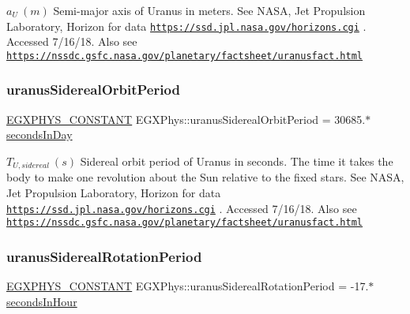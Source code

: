 $ a_{U} \ (m)$ Semi-\/major axis of Uranus in meters. See N\+A\+SA, Jet Propulsion Laboratory, Horizon for data \href{https://ssd.jpl.nasa.gov/horizons.cgi}{\tt https\+://ssd.\+jpl.\+nasa.\+gov/horizons.\+cgi} . Accessed 7/16/18. Also see \href{https://nssdc.gsfc.nasa.gov/planetary/factsheet/uranusfact.html}{\tt https\+://nssdc.\+gsfc.\+nasa.\+gov/planetary/factsheet/uranusfact.\+html} \mbox{\label{group___e_g_x_phys-_constants-_astrophysics-_solar_system-_uranus-_orbit_gaf2077b1c1b606d34f14b5d23ca2c160a}} 
\subsubsection{\texorpdfstring{uranus\+Sidereal\+Orbit\+Period}{uranusSiderealOrbitPeriod}}
{\footnotesize\ttfamily \mbox{\hyperlink{group___e_g_x_phys-_constants-_macros_ga76980d288494ce1714c9ac68a95ba702}{E\+G\+X\+P\+H\+Y\+S\+\_\+\+C\+O\+N\+S\+T\+A\+NT}} E\+G\+X\+Phys\+::uranus\+Sidereal\+Orbit\+Period = 30685.$\ast$\mbox{\hyperlink{namespace_e_g_x_phys_a93d2a00d75411b58cbf63ab3fd1f8bc2}{seconds\+In\+Day}}}

$ T_{U,sidereal} \ (s)$ Sidereal orbit period of Uranus in seconds. The time it takes the body to make one revolution about the Sun relative to the fixed stars. See N\+A\+SA, Jet Propulsion Laboratory, Horizon for data \href{https://ssd.jpl.nasa.gov/horizons.cgi}{\tt https\+://ssd.\+jpl.\+nasa.\+gov/horizons.\+cgi} . Accessed 7/16/18. Also see \href{https://nssdc.gsfc.nasa.gov/planetary/factsheet/uranusfact.html}{\tt https\+://nssdc.\+gsfc.\+nasa.\+gov/planetary/factsheet/uranusfact.\+html} \mbox{\label{group___e_g_x_phys-_constants-_astrophysics-_solar_system-_uranus-_orbit_ga69a761e11c43df2e68ad5865561bd40a}} 
\subsubsection{\texorpdfstring{uranus\+Sidereal\+Rotation\+Period}{uranusSiderealRotationPeriod}}
{\footnotesize\ttfamily \mbox{\hyperlink{group___e_g_x_phys-_constants-_macros_ga76980d288494ce1714c9ac68a95ba702}{E\+G\+X\+P\+H\+Y\+S\+\_\+\+C\+O\+N\+S\+T\+A\+NT}} E\+G\+X\+Phys\+::uranus\+Sidereal\+Rotation\+Period = -\/17.$\ast$\mbox{\hyperlink{namespace_e_g_x_phys_a7c3165cd93e36f1fb8e9fef80f117bef}{seconds\+In\+Hour}}}

